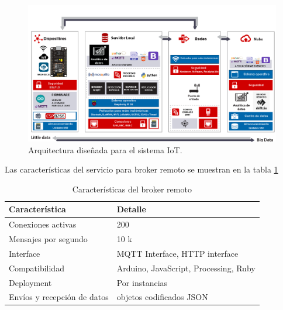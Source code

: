 \vspace{0.5cm}
\begin{landscape} %
\begin{figure}[htpb]
\centering 
\includegraphics[width=1.65\textwidth]{./Figures/arquitectura-listo.png}
\caption{Arquitectura diseñada para el sistema IoT.}
\label{fig:arquitectura}
\end{figure}
\end{landscape} %

Las características del servicio para broker remoto se muestran en la tabla  \ref{tab:brokerremoto}

\begin{table}[h]
	\centering
	\caption[Características del broker remoto]{Características del broker remoto}
	\begin{tabular}{p{5cm} p{7cm} }    
		\toprule
		\textbf{Característica} 	 & \textbf{Detalle}  \\
		\midrule
		Conexiones activas  & 200\\		
		Mensajes por segundo & 10 k \\
		Interface  & MQTT Interface, HTTP interface\\		
		Compatibilidad & Arduino, JavaScript, Processing, Ruby \\		
		Deployment 	  & Por instancias\\
		Envíos y recepción de datos & objetos codificados JSON\\
		
		\bottomrule
		\hline
	\end{tabular}
	\label{tab:brokerremoto}
\end{table}

